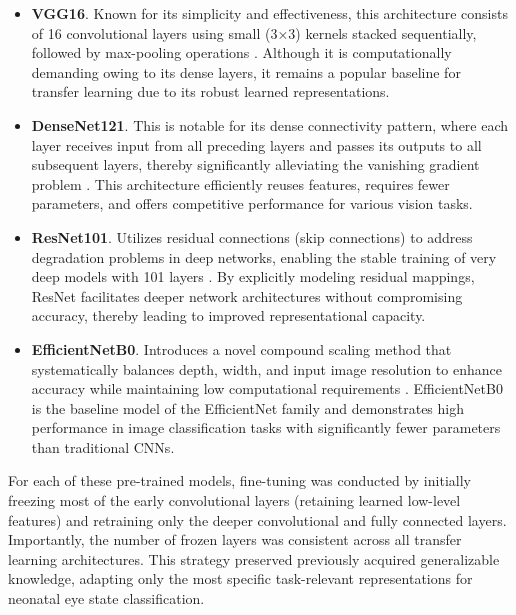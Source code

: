 \documentclass[runningheads]{llncs}
\begin{document}
\begin{itemize}
    \item \textbf{VGG16}. Known for its simplicity and effectiveness, this architecture consists of 16 convolutional layers using small (3×3) kernels stacked sequentially, followed by max-pooling operations \cite{simonyan2014very}. Although it is computationally demanding owing to its dense layers, it remains a popular baseline for transfer learning due to its robust learned representations.
    
    \item \textbf{DenseNet121}. This is notable for its dense connectivity pattern, where each layer receives input from all preceding layers and passes its outputs to all subsequent layers, thereby significantly alleviating the vanishing gradient problem \cite{huang2017densely}. This architecture efficiently reuses features, requires fewer parameters, and offers competitive performance for various vision tasks.
    
    \item \textbf{ResNet101}. Utilizes residual connections (skip connections) to address degradation problems in deep networks, enabling the stable training of very deep models with 101 layers \cite{he2016deep}. By explicitly modeling residual mappings, ResNet facilitates deeper network architectures without compromising accuracy, thereby leading to improved representational capacity.
    
    \item \textbf{EfficientNetB0}. Introduces a novel compound scaling method that systematically balances depth, width, and input image resolution to enhance accuracy while maintaining low computational requirements \cite{tan2019efficientnet}. EfficientNetB0 is the baseline model of the EfficientNet family and demonstrates high performance in image classification tasks with significantly fewer parameters than traditional CNNs.
\end{itemize}


For each of these pre-trained models, fine-tuning was conducted by initially freezing most of the early convolutional layers (retaining learned low-level features) and retraining only the deeper convolutional and fully connected layers. Importantly, the number of frozen layers was consistent across all transfer learning architectures. This strategy preserved previously acquired generalizable knowledge, adapting only the most specific task-relevant representations for neonatal eye state classification.
\end{document}
